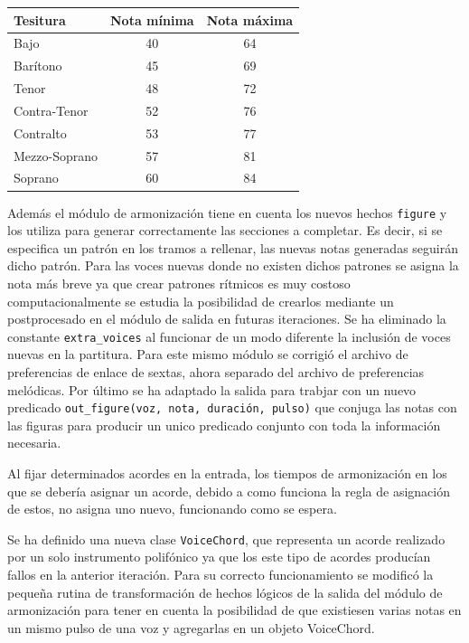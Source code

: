 \begin{center}
	\begin{tabular}{ | l | c | c | }
		\hline
		Tesitura & Nota mínima & Nota máxima \\ \hline \hline
		Bajo & 40 & 64 \\ \hline
		Barítono & 45 & 69 \\ \hline
		Tenor & 48 & 72 \\ \hline
		Contra-Tenor & 52 & 76 \\ \hline
		\hline
		Contralto & 53 & 77 \\ \hline
		Mezzo-Soprano & 57 & 81 \\ \hline
		Soprano & 60 & 84 \\ \hline
	\end{tabular}
\end{center}

Además el módulo de armonización tiene en cuenta los nuevos hechos \texttt{figure} y los utiliza para generar correctamente las secciones a completar. Es decir, si se especifica un patrón en los tramos a rellenar, las nuevas notas generadas seguirán dicho patrón. Para las voces nuevas donde no existen dichos patrones se asigna la nota más breve ya que crear patrones rítmicos es muy costoso computacionalmente se estudia la posibilidad de crearlos mediante un postprocesado en el módulo de salida en futuras iteraciones. Se ha eliminado la constante \texttt{extra\_voices} al funcionar de un modo diferente la inclusión de voces nuevas en la partitura. Para este mismo módulo se corrigió el archivo de preferencias de enlace de sextas, ahora separado del archivo de preferencias melódicas. Por último se ha adaptado la salida para trabjar con un nuevo predicado \texttt{out\_figure(voz, nota, duración, pulso)} que conjuga las notas con las figuras para producir un unico predicado conjunto con toda la información necesaria.

Al fijar determinados acordes en la entrada, los tiempos de armonización en los que se debería asignar un acorde, debido a como funciona la regla de asignación de estos, no asigna uno nuevo, funcionando como se espera.

Se ha definido una nueva clase \texttt{VoiceChord}, que representa un acorde realizado por un solo instrumento polifónico ya que los este tipo de acordes producían fallos en la anterior iteración. Para su correcto funcionamiento se modificó la pequeña rutina de transformación de hechos lógicos de la salida del módulo de armonización para tener en cuenta la posibilidad de que existiesen varias notas en un mismo pulso de una voz y agregarlas en un objeto VoiceChord.

